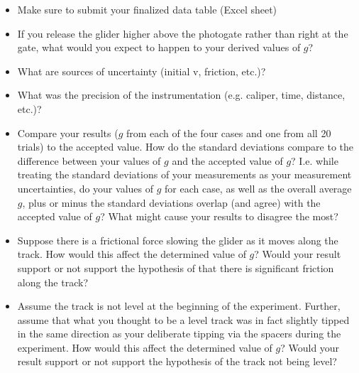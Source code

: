 \begin{itemize}

\item Make sure to submit your finalized data table (Excel sheet)

\item If you release the glider higher above the photogate rather than right at the gate, what would you expect to happen to your derived values of $g$? 
\item What are sources of uncertainty (initial v, friction, etc.)?
\item What was the precision of the instrumentation (e.g. caliper, time, distance, etc.)?
\item Compare your results ($g$ from each of the four cases and one from all 20 trials) to the accepted value. How do the standard deviations compare to the difference between your values of $g$ and the accepted value of $g$? I.e. while treating the standard deviations of your measurements as your measurement uncertainties, do your values of $g$ for each case, as well as the overall average $g$, plus or minus the standard deviations overlap (and agree) with the accepted value of $g$? What might cause your results to disagree the most?
\item Suppose there is a frictional force slowing the glider as it moves along the track. How would this affect the determined value of $g$? Would your result support or not support the hypothesis of that there is significant friction along the track?
\item Assume the track is not level at the beginning of the experiment. Further, assume that what you thought to be a level track was in fact slightly tipped in the same direction as your deliberate tipping via the spacers during the experiment. How would this affect the determined value of $g$? Would your result support or not support the hypothesis of the track not being level?



\end{itemize}

